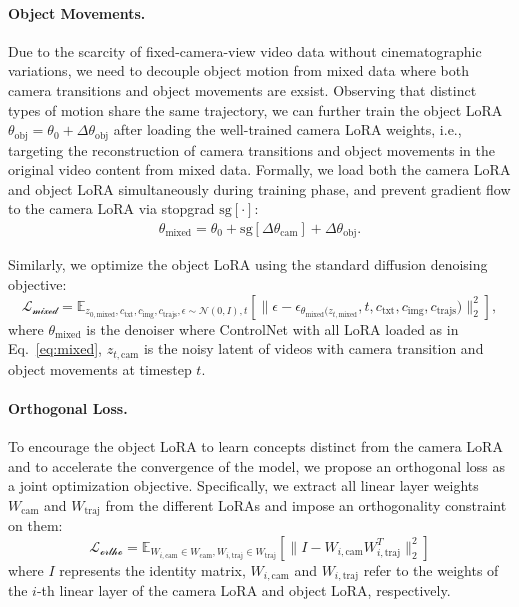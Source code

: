 \documentclass{article} %
\begin{document}
\paragraph{Object Movements.}
Due to the scarcity of fixed-camera-view video data without cinematographic variations, we need to decouple object motion from mixed data where both camera transitions and object movements are exsist. 
Observing that distinct types of motion share the same trajectory, we can further train the object LoRA $\theta_{\text{obj}} = \theta_0 + \Delta\theta_\text{obj}$ after loading the well-trained camera LoRA weights, i.e., targeting the reconstruction of camera transitions and object movements in the original video content from mixed data. Formally, we load both the camera LoRA and object LoRA simultaneously during training phase, and prevent gradient flow to the camera LoRA via stopgrad $\text{sg}[\cdot]$: 
\begin{equation}
    \label{eq:mixed}
    \begin{aligned}
        \theta_{\text{mixed}} = \theta_0 + \text{sg}[\Delta \theta_{\text{cam}}] + \Delta \theta_{\text{obj}}.
    \end{aligned}
\end{equation}

Similarly, we optimize the object LoRA using the standard diffusion denoising objective:
\begin{equation}
  \mathcal{L_\text{mixed}} = \mathbb{E}_{z_{0,\text{mixed}}, c_\text{txt}, c_\text{img}, c_\text{trajs}, \epsilon\sim\mathcal{N}(0, \mathit{I}), t}\left\lbrack
  \lVert \epsilon - \epsilon_{\theta_\text{mixed}(z_{t,\text{mixed}}}, t, c_\text{txt}, c_\text{img}, c_\text{trajs}) \rVert_2^2 \right\rbrack,
  \label{euqation: noise_preditcion_loss_obj}
\end{equation}
where $\theta_\text{mixed}$ is the denoiser where ControlNet with all LoRA loaded as in Eq.~\ref{eq:mixed},  $z_{t,\text{cam}}$ is the noisy latent of videos with camera transition and object movements at timestep $t$.




\paragraph{Orthogonal Loss.}
To encourage the object LoRA to learn concepts distinct from the camera LoRA and to accelerate the convergence of the model, we propose an orthogonal loss as a joint optimization objective. Specifically, we extract all linear layer weights $W_{\text{cam}}$ and $W_{\text{traj}}$ from the different LoRAs and impose an orthogonality constraint on them:
\begin{equation}
  \mathcal{L_\text{ortho}} = \mathbb{E}_{W_{i,\text{cam}}\in W_{\text{cam}}, W_{i,\text{traj}}\in W_{\text{traj}}}\left\lbrack
  \lVert{I - W_{i,\text{cam}} W_{i,\text{traj}}^T}\rVert_2^2 \right\rbrack
  \label{euqation: ortho_loss}
\end{equation}
where $I$ represents the identity matrix, $W_{i,\text{cam}}$ and $W_{i,\text{traj}}$ refer to  the weights of the $i$-th linear layer of the camera LoRA and object LoRA, respectively.
\end{document}
